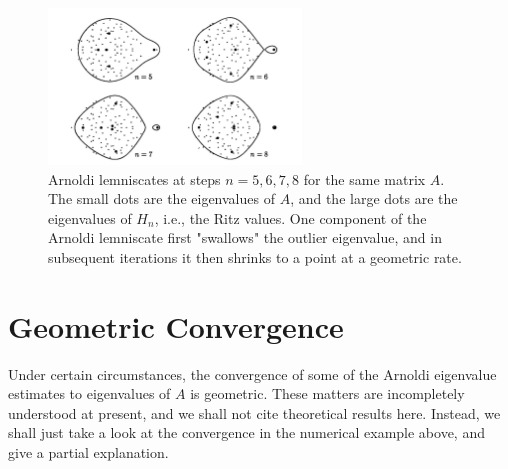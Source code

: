 \begin{figure}[H]
    \centering
    \includegraphics[width=0.6\textwidth]{figures/33-2.png}
    \caption{Arnoldi lemniscates at steps $n=5,6,7,8$ for the same matrix $A$. The small dots are the eigenvalues of $A$, and the large dots are the eigenvalues of $H_n$, i.e., the Ritz values. One component of the Arnoldi lemniscate first "swallows" the outlier eigenvalue, and in subsequent iterations it then shrinks to a point at a geometric rate.}
\end{figure}
 
 \section{Geometric Convergence} 
 Under certain circumstances, the convergence of some of the Arnoldi eigenvalue estimates to eigenvalues of $A$ is geometric. These matters are incompletely understood at present, and we shall not cite theoretical results here. Instead, we shall just take a look at the convergence in the numerical example above, and give a partial explanation.
 
